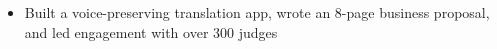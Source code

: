 \begin{itemize}
    \item Built a voice-preserving translation app, wrote an 8-page business proposal, and led engagement with over 300 judges
\end{itemize}